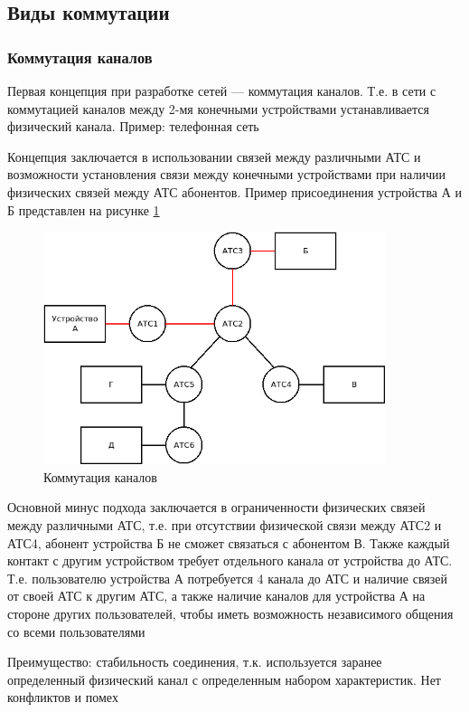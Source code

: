\documentclass[a4paper]{article}
\begin{document}
\subsection{Виды коммутации}
\subsubsection{Коммутация каналов}
Первая концепция при разработке сетей --- коммутация каналов. Т.е. в сети с коммутацией каналов между 2-мя конечными устройствами устанавливается физический канала. Пример: телефонная сеть

Концепция заключается в использовании связей между различными АТС и возможности установления связи между конечными устройствами при наличии физических связей между АТС абонентов. Пример присоединения устройства А и Б представлен на рисунке \ref{fig:pic-7-channel-commutation}

\begin{figure}[!h]
	\centering
	\includegraphics[width=10cm]{7-channel-commutation.png}
	\caption{Коммутация каналов}
	\label{fig:pic-7-channel-commutation}
\end{figure}

Основной минус подхода заключается в ограниченности физических связей между различными АТС, т.е. при отсутствии физической связи между АТС2 и АТС4, абонент устройства Б не сможет связаться с абонентом В. Также каждый контакт с другим устройством требует отдельного канала от устройства до АТС. Т.е. пользователю устройства А потребуется 4 канала до АТС и наличие связей от своей АТС к другим АТС, а также наличие каналов для устройства А на стороне других пользователей, чтобы иметь возможность независимого общения со всеми пользователями

Преимущество: стабильность соединения, т.к. используется заранее определенный физический канал с определенным набором характеристик. Нет конфликтов и помех
\end{document}
